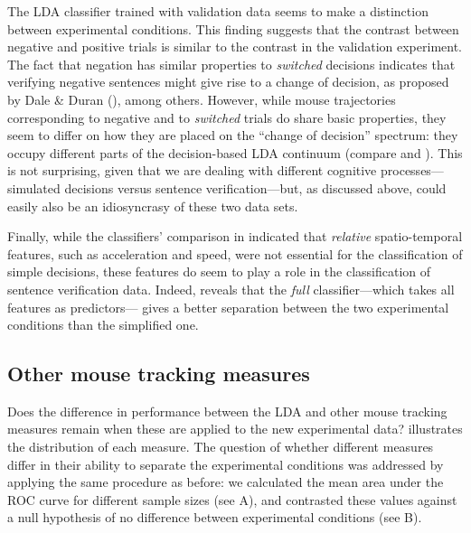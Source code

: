 \documentclass[11pt]{article}
\begin{document}
The LDA classifier trained with validation data seems to make a distinction between experimental conditions. This finding suggests that the contrast between negative and positive trials is similar to the contrast in the validation experiment. The fact that negation has similar properties to \emph{switched} decisions indicates that verifying negative sentences might %
give rise to a change of decision, as proposed by Dale \& Duran (\citeyear{Dale2011}), among others.  
However, while mouse trajectories corresponding to negative and to \emph{switched} trials do share basic properties, they seem to differ on how they are placed on the ``change of decision'' spectrum: they occupy different parts of the decision-based LDA continuum (compare  and ). This is not surprising, given that we are dealing with different cognitive processes---simulated decisions versus sentence verification---but, as discussed above, could easily also be an idiosyncrasy of these two data sets.

Finally, while the classifiers' comparison in  indicated that \emph{relative}
spatio-temporal features, such as acceleration and speed, were not essential for the classification of simple decisions, these features do seem to play a role in the classification of sentence verification data. Indeed,  reveals that the \emph{full} classifier---which takes all features as predictors--- gives a better separation between the two experimental conditions than the simplified one.   

\subsection{Other mouse tracking measures}
Does the difference in performance between the LDA and other mouse tracking measures remain when these are applied to the new experimental data?
 illustrates the distribution of each measure.
The question of whether different measures differ in their ability to separate the experimental conditions was addressed by applying the same procedure as before: we calculated the mean area under the ROC curve for different sample sizes (see A), and contrasted these values against a null hypothesis of no difference between experimental conditions (see B).
\end{document}
